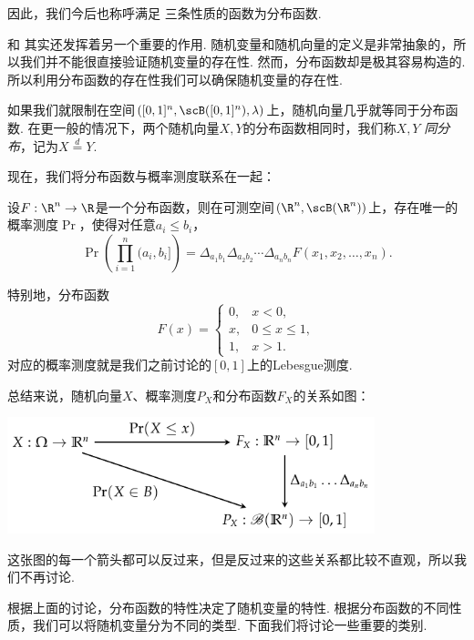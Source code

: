 因此，我们今后也称呼满足 三条性质的函数为分布函数. 

\begin{remark}
 和 其实还发挥着另一个重要的作用. 随机变量和随机向量的定义是非常抽象的，所以我们并不能很直接验证随机变量的存在性. 然而，分布函数却是极其容易构造的. 所以利用分布函数的存在性我们可以确保随机变量的存在性. 
\end{remark}

如果我们就限制在空间$([0,1]^n,\scB([0,1]^n),\lambda)$上，随机向量几乎就等同于分布函数. 在更一般的情况下，两个随机向量$X,Y$的分布函数相同时，我们称$X,Y$ \emph{同分布}，记为$X \stackrel{d}{=} Y$.

现在，我们将分布函数与概率测度联系在一起：

\begin{theorem}\label{thm:uniqueness-of-distribution-function}
设$F:\R^n\to\R$是一个分布函数，则在可测空间$(\R^n,\scB(\R^n))$上，存在唯一的概率测度$\Pr$，使得对任意$a_i\leq b_i$，
\[
    \Pr\left(\prod_{i=1}^n(a_i,b_i]\right) = \Delta_{a_1b_1}\Delta_{a_2b_2}\cdots\Delta_{a_nb_n}F(x_1,x_2,\ldots,x_n).
\]
\end{theorem}

特别地，分布函数
\[F(x)=\begin{cases}
    0,&x<0,\\
    x,&0\leq x\leq 1,\\
    1,&x>1.
\end{cases}\]
对应的概率测度就是我们之前讨论的$[0,1]$上的Lebesgue测度.

总结来说，随机向量$X$、概率测度$P_X$和分布函数$F_X$的关系如图：
\begin{center}
\includegraphics[width=0.8\textwidth]{Figures/prob/prob-relations.pdf}
\end{center}

这张图的每一个箭头都可以反过来，但是反过来的这些关系都比较不直观，所以我们不再讨论. 

根据上面的讨论，分布函数的特性决定了随机变量的特性. 根据分布函数的不同性质，我们可以将随机变量分为不同的类型. 下面我们将讨论一些重要的类别. 

